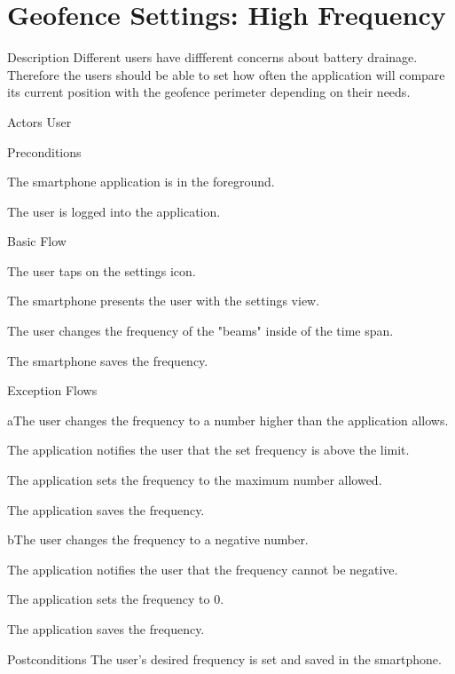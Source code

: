 \section{Geofence Settings: High Frequency}

%
\begin{cpart}{Description}
Different users have diffferent concerns about battery drainage. Therefore the users should be able to set how often the application will compare its current position with the geofence perimeter depending on their needs.
\end{cpart}


%
\begin{cpart}{Actors}
User
\end{cpart}

%
\begin{cpartList}{Preconditions}
\item The smartphone application is in the foreground.
\item The user is logged into the application.
\end{cpartList}

%
\begin{cpartList}{Basic Flow}
  \item The user taps on the settings icon.
  \item The smartphone presents the user with the settings view.
  \item The user changes the frequency of the "beams" inside of the time span.
  \item The smartphone saves the frequency.
\end{cpartList}

%
\begin{cpartList}{Exception Flows}
  \begin{innerList}{3}{a}{The user changes the frequency to a number higher than the application allows.}
    \item The application notifies the user that the set frequency is above the limit.
    \item The application sets the frequency to the maximum number allowed.
    \item The application saves the frequency.
  \end{innerList}
  \begin{innerList}{3}{b}{The user changes the frequency to a negative number.}
    \item The application notifies the user that the frequency cannot be negative.
    \item The application sets the frequency to 0.
    \item The application saves the frequency.
  \end{innerList}
\end{cpartList}

%
\begin{cpart}{Postconditions}
The user's desired frequency is set and saved in the smartphone.
\end{cpart}

\clearpage
